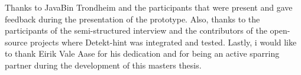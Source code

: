\documentclass[pdftex,10pt,b5paper,twoside]{report}
\begin{document}
Thanks to JavaBin Trondheim and the participants that were present and gave feedback during the presentation of the prototype. Also, thanks to the participants of the semi-structured interview and the contributors of the open-source projects where Detekt-hint was integrated and tested. Lastly, i would like to thank Eirik Vale Aase for his dedication and for being an active sparring partner during the development of this masters thesis.

\printglossary[type=\acronymtype]
\printbibliography

\appendix
\label{appendix}

\end{document}
